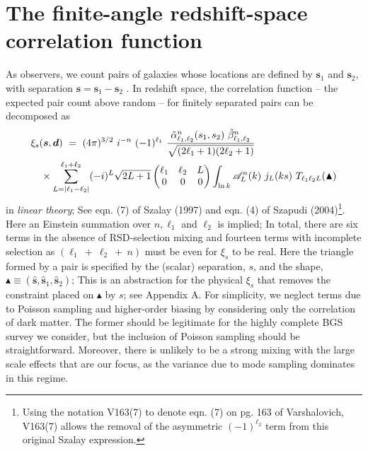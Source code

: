 \documentclass[useAMS,usenatbib]{mn2e}
\newcommand{\tj}[6]{ \begin{pmatrix}
   #1 & #2 & #3 \\
   #4 & #5 & #6 
  \end{pmatrix}}
\newcommand{\vb}[1]{\mathbf{#1}}
\begin{document}
\section{The finite-angle redshift-space correlation function}
As observers, we count pairs of galaxies whose locations are defined by $\vb{s}_1$ and $\vb{s}_2$, with separation $\vb{s} = \vb{s}_1 - \vb{s}_2$ .  In redshift space, the correlation function -- the expected pair count above random -- for finitely separated pairs can be decomposed as  
\begin{align}
&\xi_s(\boldsymbol s, \boldsymbol d) \ = \ (4 \pi)^{3/2} \ i^{-n} \ (-1)^{\ell_1} 
 \  \frac{\tilde \alpha^n_{\ell_1, \ell_2}(s_1, s_2) \ \tilde \beta^n_{\ell_1, \ell_2}}{\sqrt{(2 \ell_1 +1)(2 \ell_2 + 1)}} \notag \\ & \quad \times \sum_{L=|\ell_1 - \ell_2|}^{\ell_1 + \ell_2} (-i)^L \sqrt{2L+1}  \tj{\ell_1}{\ell_2}{L}{0}{0}{0} \int_{\ln k}  \mathcal{A}^{n}_L(k) \ j_L(ks) \ T_{\ell_1 \ell_2 L} (\blacktriangle)
\end{align}
in \emph{linear theory};  See eqn. (7) of Szalay (1997) and eqn. (4) of Szapudi (2004)\footnote{Using the notation V163(7) to denote eqn. (7) on pg. 163 of Varshalovich, V163(7) allows the removal of the asymmetric $(-1)^{\ell_2}$ term from this original Szalay expression.}.  Here an Einstein summation over $n, \ell_1$ and $\ell_2$ is implied; In total, there are six terms in the absence of RSD-selection mixing and fourteen terms with incomplete selection as $(\ell_1~+~\ell_2~+~n)$ must be even for $\xi_s$ to be real.  Here the triangle formed by a pair is specified by the (scalar) separation, $s$, and the shape, $\blacktriangle \equiv (\boldsymbol {\hat s}, \boldsymbol {\hat s}_1, \boldsymbol {\hat s}_2)$;  This is an abstraction for the physical $\xi_s$ that removes the constraint placed on $\blacktriangle$ by $s$; see Appendix A.  For simplicity, we neglect terms due to Poisson sampling and higher-order biasing by considering only the correlation of dark matter.  The former should be legitimate for the highly complete BGS survey we consider, but the inclusion of Poisson sampling should be straightforward.  Moreover, there is unlikely to be a strong mixing with the large scale effects that are our focus, as the variance due to mode sampling dominates in this regime.  
\end{document}
